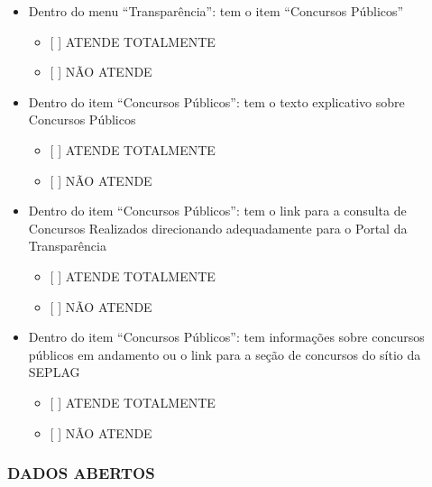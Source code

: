 \documentclass[]{book}
\providecommand{\tightlist}{%
  \setlength{\itemsep}{0pt}\setlength{\parskip}{0pt}}
\begin{document}
\begin{itemize}
\tightlist
\item
  Dentro do menu ``Transparência'': tem o item ``Concursos Públicos''

  \begin{itemize}
  \tightlist
  \item
    {[} {]} ATENDE TOTALMENTE
  \item
    {[} {]} NÃO ATENDE
  \end{itemize}
\item
  Dentro do item ``Concursos Públicos'': tem o texto explicativo sobre Concursos Públicos

  \begin{itemize}
  \tightlist
  \item
    {[} {]} ATENDE TOTALMENTE
  \item
    {[} {]} NÃO ATENDE
  \end{itemize}
\item
  Dentro do item ``Concursos Públicos'': tem o link para a consulta de Concursos Realizados direcionando adequadamente para o Portal da Transparência

  \begin{itemize}
  \tightlist
  \item
    {[} {]} ATENDE TOTALMENTE
  \item
    {[} {]} NÃO ATENDE
  \end{itemize}
\item
  Dentro do item ``Concursos Públicos'': tem informações sobre concursos públicos em andamento ou o link para a seção de concursos do sítio da SEPLAG

  \begin{itemize}
  \tightlist
  \item
    {[} {]} ATENDE TOTALMENTE
  \item
    {[} {]} NÃO ATENDE
  \end{itemize}
\end{itemize}

\hypertarget{dados-abertos-1}{%
\subsubsection*{DADOS ABERTOS}\label{dados-abertos-1}}
\end{document}

